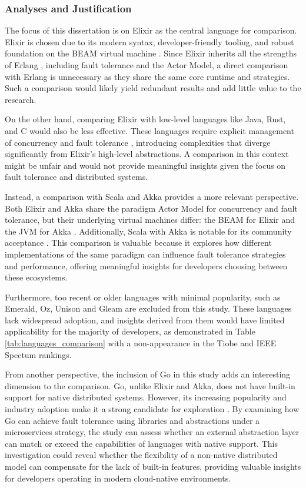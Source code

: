 \subsubsection{Analyses and Justification}

The focus of this dissertation is on Elixir as the central language for comparison. Elixir is chosen due to its modern syntax, developer-friendly tooling, and robust foundation on the BEAM virtual machine \cite{Juric2024}. Since Elixir inherits all the strengths of Erlang \cite{Valkov2018}, including fault tolerance and the Actor Model, a direct comparison with Erlang is unnecessary as they share the same core runtime and strategies. Such a comparison would likely yield redundant results and add little value to the research.

On the other hand, comparing Elixir with low-level languages like Java, Rust, and C would also be less effective. These languages require explicit management of concurrency and fault tolerance \cite{Valkov2018}, introducing complexities that diverge significantly from Elixir's high-level abstractions. A comparison in this context might be unfair and would not provide meaningful insights given the focus on fault tolerance and distributed systems.

Instead, a comparison with Scala and Akka provides a more relevant perspective. Both Elixir and Akka share the paradigm Actor Model for concurrency and fault tolerance, but their underlying virtual machines differ: the BEAM for Elixir and the \gls{JVM} for Akka \cite{Abraham2023}. Additionally, Scala with Akka is notable for its community acceptance \cite{Valkov2018}. This comparison is valuable because it explores how different implementations of the same paradigm can influence fault tolerance strategies and performance, offering meaningful insights for developers choosing between these ecosystems.

Furthermore, too recent or older languages with minimal popularity, such as Emerald, Oz, Unison and Gleam are excluded from this study. These languages lack widespread adoption, and insights derived from them would have limited applicability for the majority of developers, as demonstrated in Table \ref{tab:languages_comparison} with a non-appearance in the Tiobe and IEEE Spectum rankings.

From another perspective, the inclusion of Go in this study adds an interesting dimension to the comparison. Go, unlike Elixir and Akka, does not have built-in support for native distributed systems. However, its increasing popularity and industry adoption make it a strong candidate for exploration \cite{Brolos2021}. By examining how Go can achieve fault tolerance using libraries and abstractions under a microservices strategy, the study can assess whether an external abstraction layer can match or exceed the capabilities of languages with native support. This investigation could reveal whether the flexibility of a non-native distributed model can compensate for the lack of built-in features, providing valuable insights for developers operating in modern cloud-native environments.

